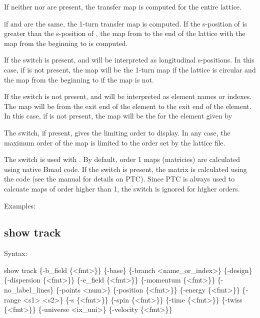 {{{{{{{{{If neither  nor  are present, the transfer map is computed for the
entire lattice.

if  and  are the same, the 1-turn transfer map is computed. If the
s-position of  is greater than the s-position of , the map from
 to the end of the lattice with the map from the beginning to  is
computed.

If the  switch is present,  and  will be interpreted as
longitudinal s-positions. In this case, if  is not present, the map will be the
1-turn map if the lattice is circular and the map from the beginning to  if the
map is not.

If the  switch is not present,  and  will be interpreted as
element names or indexes. The map will be from the exit end of the  element to
the exit end of the  element. In this case, if  is not present, the map
will be the for the element given by 

The  switch, if present, gives the limiting order to display. In any case, the
maximum order of the map is limited to the order set by the lattice file.

The  switch is used with . By default, order 1 maps (matricies) are calculated
using native Bmad code. If the  switch is present, the matrix is calculated using the
 code (see the \bmad manual for details on PTC). Since PTC is always used to calcuate maps
of order higher than 1, the  switch is ignored for higher orders.

Examples:


\subsection{show track}
\label{s:show.track}

Syntax:
\begin{example}
  show track \{-b_field \{<fmt>\}\} \{-base\} \{-branch <name_or_index>\} \{-design\} 
      \{-dispersion \{<fmt>\}\} \{-e_field \{<fmt>\}\} \{-momentum \{<fmt>\}\} \{-no_label_lines\} 
      \{-points <num>\} \{-position \{<fmt>\}\} \{-energy \{<fmt>\}\} \{-range <s1> <s2>\}
      \{-s \{<fmt>\}\} \{-spin \{<fmt>\}\} \{-time \{<fmt>\}\} \{-twiss \{<fmt>\}\}
      \{-universe <ix_uni>\} \{-velocity \{<fmt>\}\}
\end{example}

}}}}}}}}}
